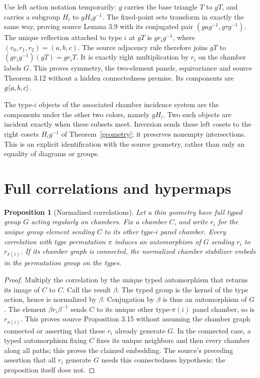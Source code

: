 \documentclass[11pt,a4paper]{article}
\newtheorem{proposition}[theorem]{Proposition}\newtheorem{corollary}[theorem]{Corollary}
\begin{document}
Use left action notation temporarily: $g$ carries the base triangle $T$
to $gT$, and carries a subgroup $H_i$ to $gH_i g^{-1}$. The fixed-point
sets transform in exactly the same way, proving source Lemma 3.9 with
its conjugated pair $(gag^{-1},g\tau g^{-1})$. The unique reflection
attached to type $i$ at $gT$ is $gr_i g^{-1}$, where $(r_0,r_1,r_2)=(a,b,c)$.
The source adjacency rule therefore joins $gT$ to
$(gr_i g^{-1})(gT)=gr_iT$. It is exactly right multiplication by $r_i$
on the chamber labels $G$. This proves symmetry, the two-element panels,
equivariance and source Theorem 3.12 without a hidden connectedness premise.
Its components are $g\langle a,b,c\rangle$.

The type-$i$ objects of the associated chamber incidence system are the
components under the other two colors, namely $gH_i$. Two such objects
are incident exactly when these subsets meet. Inversion sends these left
cosets to the right cosets $H_i g^{-1}$ of Theorem~\ref{geometry}; it
preserves nonempty intersections. This is an explicit identification
with the source geometry, rather than only an equality of diagrams or groups.

\section{Full correlations and hypermaps}
\begin{proposition}[Normalized correlations]\label{correlations}
Let a thin geometry have full typed group $G$ acting regularly on chambers.
Fix a chamber $C$, and write $r_i$ for the unique group element sending
$C$ to its other type-$i$ panel chamber. Every correlation with type
permutation $\pi$ induces an automorphism of $G$ sending $r_i$ to $r_{\pi(i)}$.
If its chamber graph is connected, the normalized chamber stabilizer
embeds in the permutation group on the types.
\end{proposition}
\begin{proof}
Multiply the correlation by the unique typed automorphism that returns
its image of $C$ to $C$. Call the result $\beta$. The typed group is the
kernel of the type action, hence is normalized by $\beta$. Conjugation
by $\beta$ is thus an automorphism of $G$. The element
$\beta r_i\beta^{-1}$ sends $C$ to its unique other type-$\pi(i)$ panel
chamber, so is $r_{\pi(i)}$. This proves source Proposition 3.15 without
assuming the chamber graph connected or asserting that these $r_i$
already generate $G$. In the connected case, a typed automorphism fixing
$C$ fixes its unique neighbors and then every chamber along all paths;
this proves the claimed embedding. The source's preceding assertion
that all $r_i$ generate $G$ needs this connectedness hypothesis; the
proposition itself does not.
\end{proof}
\end{document}
